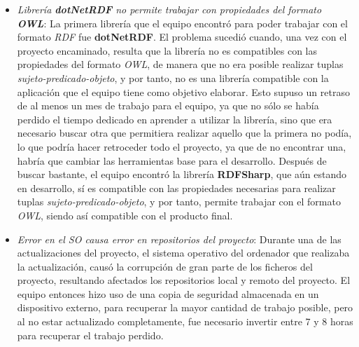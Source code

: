 \begin{itemize}
    \item \textit{Librería \textnormal{\textbf{dotNetRDF}} no permite trabajar con propiedades del formato \textnormal{\textbf{OWL}}}:
    La primera librería que el equipo encontró para poder trabajar con el formato \textit{RDF} fue \textbf{dotNetRDF}. El problema 
    sucedió cuando, una vez con el proyecto encaminado, resulta que la librería no es compatibles con las propiedades del formato \textit{OWL}, 
    de manera que no era posible realizar tuplas \textit{sujeto-predicado-objeto}, y por tanto, no es una librería compatible con la aplicación que 
    el equipo tiene como objetivo elaborar. Esto supuso un retraso de al menos un mes de trabajo para el equipo, ya que no sólo se había perdido 
    el tiempo dedicado en aprender a utilizar la librería, sino que era necesario buscar otra que permitiera realizar aquello que la primera no podía, 
    lo que podría hacer retroceder todo el proyecto, ya que de no encontrar una, habría que cambiar las herramientas base para el desarrollo.
    Después de buscar bastante, el equipo encontró la librería \textbf{RDFSharp}, que aún estando en desarrollo, sí es compatible con las propiedades 
    necesarias para realizar tuplas \textit{sujeto-predicado-objeto}, y por tanto, permite trabajar con el formato \textit{OWL}, siendo así compatible 
    con el producto final.

    \item \textit{Error en el SO causa error en repositorios del proyecto}: Durante una de las actualizaciones del proyecto, el sistema operativo del 
    ordenador que realizaba la actualización, causó la corrupción de gran parte de los ficheros del proyecto, resultando afectados los repositorios local 
    y remoto del proyecto. El equipo entonces hizo uso de una copia de seguridad almacenada en un dispositivo externo, para recuperar la mayor cantidad 
    de trabajo posible, pero al no estar actualizado completamente, fue necesario invertir entre 7 y 8 horas para recuperar el trabajo perdido.
\end{itemize}









